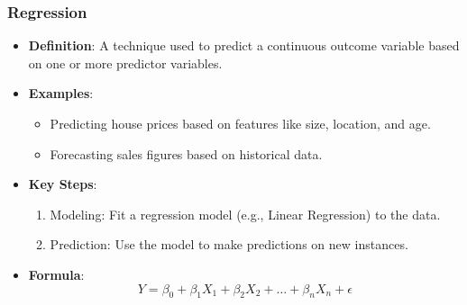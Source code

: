 \documentclass[aspectratio=169]{beamer}
\begin{document}
\begin{frame}[fragile]
    \frametitle{Regression}
    \begin{itemize}
        \item \textbf{Definition}: A technique used to predict a continuous outcome variable based on one or more predictor variables.
        \item \textbf{Examples}:
            \begin{itemize}
                \item Predicting house prices based on features like size, location, and age.
                \item Forecasting sales figures based on historical data.
            \end{itemize}
        \item \textbf{Key Steps}:
            \begin{enumerate}
                \item Modeling: Fit a regression model (e.g., Linear Regression) to the data.
                \item Prediction: Use the model to make predictions on new instances.
            \end{enumerate}
        \item \textbf{Formula}:
        \begin{equation}
        Y = \beta_0 + \beta_1X_1 + \beta_2X_2 + \ldots + \beta_nX_n + \epsilon
        \end{equation}
    \end{itemize}
\end{frame}
\end{document}
